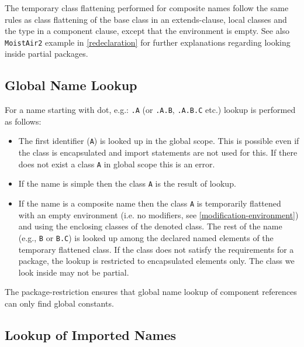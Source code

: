\begin{nonnormative}
The temporary class flattening performed for composite names
follow the same rules as class flattening of the base class in an
extends-clause, local classes and the type in a component clause, except
that the environment is empty. See also \lstinline!MoistAir2! example in
\autoref{redeclaration} for further explanations regarding looking inside
partial packages.
\end{nonnormative}

\subsection{Global Name Lookup}

For a name starting with dot, e.g.: \lstinline!.A! (or \lstinline!.A.B!, \lstinline!.A.B.C! etc.) lookup is performed as follows:
\begin{itemize}
\item
  The first identifier (\lstinline!A!) is looked up in the global scope. This is
  possible even if the class is encapsulated and import statements are
  not used for this. If there does not exist a class \lstinline!A! in global scope
  this is an error.
\item
  If the name is simple then the class \lstinline!A! is the result of lookup.
\item
  If the name is a composite name then the class \lstinline!A! is temporarily
  flattened with an empty environment (i.e. no modifiers, see
  \autoref{modification-environment}) and using the enclosing classes of the denoted class. The rest
  of the name (e.g., \lstinline!B! or \lstinline!B.C!) is looked up among the declared named
  elements of the temporary flattened class. If the class does not
  satisfy the requirements for a package, the lookup is restricted to
  encapsulated elements only. The class we look inside may not be
  partial.
\end{itemize}

\begin{nonnormative}
The package-restriction ensures that global name lookup of
component references can only find global constants.
\end{nonnormative}

\subsection{Lookup of Imported Names}

